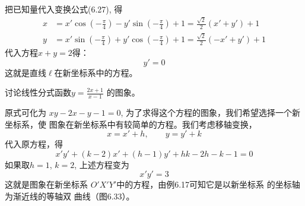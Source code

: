 \begin{solution}
把已知量代入变换公式(6.27), 得
\[\begin{split}
 x&=x'\cos\left(-\frac{\pi}{4}\right)-y'\sin\left(-\frac{\pi}{4}\right)+1=\frac{\sqrt{2}}{2}(x'+y')+1\\
y&=x'\sin\left(-\frac{\pi}{4}\right)+y'\cos\left(-\frac{\pi}{4}\right)+1=\frac{\sqrt{2}}{2}(-x'+y')+1   
\end{split}\]
代入方程$x+y=2$得：$$y'=0$$
这就是直线$\ell$在新坐标系中的方程。
\end{solution}

\begin{example}
    讨论线性分式函数$y=\frac{2x+1}{x-1}$
    的图象。
\end{example}

\begin{solution}
    原式可化为 $xy-2x-y-1=0$, 为了求得这个方程的图象，我们希望选择一个新坐标系，使
    图象在新坐标系中有较简单的方程。我们考虑移轴变换，
\[x=x'+h,\qquad y=y'+k\]
代入原方程，得
\[x'y'+(k-2)x'+(h-1)y'+hk-2h-k-1=0\]
如果取$h=1$, $k=2$, 上述方程变为
\[x'y'=3\]
这就是图象在新坐标系
$O'X'Y'$中的方程，由例6.17可知它是以新坐标系
的坐标轴为渐近线的等轴双
曲线（图6.33）。
\end{solution}

\begin{figure}[htp]
    \centering
{}
    \caption{}
\end{figure}



